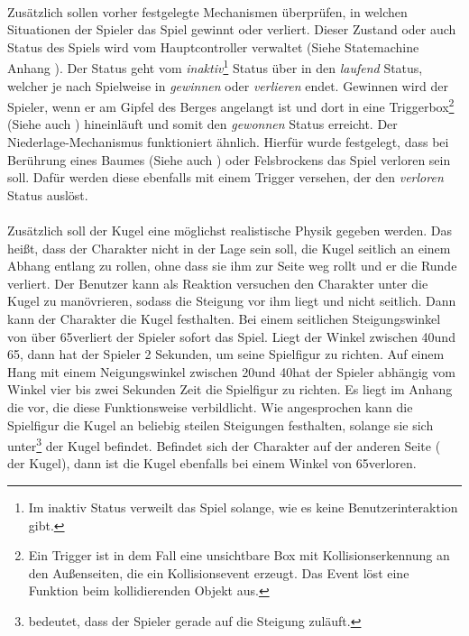 \paragraph{}
Zusätzlich sollen vorher festgelegte Mechanismen überprüfen, in welchen Situationen der Spieler das Spiel gewinnt oder verliert. Dieser Zustand oder auch Status des Spiels wird vom Hauptcontroller verwaltet (Siehe Statemachine Anhang ). Der Status geht vom \textit{inaktiv}\footnote{Im inaktiv Status verweilt das Spiel solange, wie es keine Benutzerinteraktion gibt.} Status über in den \textit{laufend} Status, welcher je nach Spielweise in \textit{gewinnen} oder \textit{verlieren} endet. Gewinnen wird der Spieler, wenn er am Gipfel des Berges angelangt ist und dort in eine Triggerbox\footnote{Ein Trigger ist in dem Fall eine unsichtbare Box mit Kollisionserkennung an den Außenseiten, die ein Kollisionsevent erzeugt. Das Event löst eine Funktion beim kollidierenden Objekt aus.} (Siehe auch ) hineinläuft und somit den \textit{gewonnen} Status erreicht. Der Niederlage-Mechanismus funktioniert ähnlich. Hierfür wurde festgelegt, dass bei Berührung eines Baumes (Siehe auch ) oder Felsbrockens das Spiel verloren sein soll. Dafür werden diese ebenfalls mit einem Trigger versehen, der den \textit{verloren} Status auslöst.
\paragraph{}
Zusätzlich soll der Kugel eine möglichst realistische Physik gegeben werden. Das heißt, dass der Charakter nicht in der Lage sein soll, die Kugel seitlich an einem Abhang entlang zu rollen, ohne dass sie ihm zur Seite weg rollt und er die Runde verliert. Der Benutzer kann als Reaktion versuchen den Charakter unter die Kugel zu manövrieren, sodass die Steigung vor ihm liegt und nicht seitlich. Dann kann der Charakter die Kugel festhalten. Bei einem seitlichen Steigungswinkel von über 65\cc verliert der Spieler sofort das Spiel. Liegt der Winkel zwischen 40\cc und 65\cc, dann hat der Spieler 2 Sekunden, um seine Spielfigur zu richten. Auf einem Hang mit einem Neigungswinkel zwischen 20\cc und 40\cc hat der Spieler abhängig vom Winkel vier bis zwei Sekunden Zeit die Spielfigur zu richten. Es liegt im Anhang die  vor, die diese Funktionsweise verbildlicht. Wie angesprochen kann die Spielfigur die Kugel an beliebig steilen Steigungen festhalten, solange sie sich unter\footnote{ bedeutet, dass der Spieler gerade auf die Steigung zuläuft.} der Kugel befindet. Befindet sich der Charakter auf der anderen Seite ( der Kugel), dann ist die Kugel ebenfalls bei einem Winkel von 65\cc verloren.
